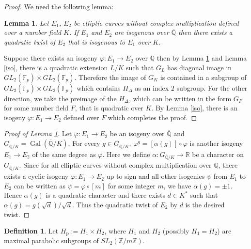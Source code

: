 \documentclass[12pt]{amsart}
\newtheorem{lem}[thm]{Lemma}
\theoremstyle{definition}
\newtheorem{defn}[thm]{Definition}
\theoremstyle{remark}
\numberwithin{equation}{section}
\newcommand{\F}{\mathbb{F}}
\newcommand{\Z}{\mathbb{Z}}
\newcommand{\Q}{\mathbb{Q}}
\DeclareMathOperator{\Gal}{Gal}
\begin{document}
\begin{proof}
We need the following lemma:
	 \begin{lem}\label{twist}
Let $E_{1}$, $E_{2}$ be elliptic curves without complex multiplication defined over a number field $K$. If $E_{1}$ and $E_{2}$ are isogenous over $\overline{\Q}$ then there exists a quadratic twist of $E_{2}$ that is isogenous to $E_{1}$ over $K$.	
\end{lem}
Suppose there exists an isogeny $\varphi: E_{1} \to E_{2}$ over $\overline{\Q}$ then by Lemma \ref{twist} and Lemma \ref{iso}, there is a quadratic extension $L/K$ such that $G_{L}$ has diagonal image in $GL_{2}(\F_{p}) \times GL_{2}(\F_{p})$. Therefore the image of $G_{K}$ is contained in a subgroup of $GL_{2}(\F_{p}) \times GL_{2}(\F_{p})$ which contains $H_{\Delta}$ as an index $2$ subgroup.
For the other direction, we take the preimage of the $H_{\Delta}$, which can be written in the form $G_{F}$ for some number field $F$, that is quadratic over $K$. By Lemma \ref{iso}, there is an isogeny $\varphi: E_{1} \to E_{2}$ defined over $F$ which completes the proof. 

\end{proof}



  \begin{proof}[Proof of Lemma \ref{twist}]
  Let $\varphi: E_{1} \to E_{2}$ be an isogeny over $\overline{\Q}$ and $G_{\overline{\Q}/K}=\Gal(\overline{\Q}/K)$. For every $g\in G_{\overline{\Q}/K}$, $\varphi^{g}=[\alpha(g)] \circ \varphi $ is another isogeny $E_{1} \to E_{2}$ of the same degree as $\varphi$. Here we define $\alpha: G_{\overline{\Q}/K} \to \mathbb{R}$ be a character on $G_{\overline{\Q}/K}$. Since for all elliptic curves without complex multiplication over $\overline{\Q}$, there exists a cyclic isogeny $\varphi: E_{1} \to E_{2}$ up to sign and all other isogenies $\psi$ from $E_{1}$ to $E_{2}$ can be written as $\psi=\varphi \circ [m]$ for some integer $m$, we have $\alpha(g)= \pm 1$. Hence $\alpha(g)$ is a quadratic character and there exists $d \in K^{*}$ such that $\alpha(g)=g(\sqrt{d})/\sqrt{d}$. Thus the quadratic twist of $E_{2}$ by $d$ is the desired twist. 
 
  \end{proof}


\vspace{1em}


\begin{defn}\label{Hprod}
  Let $H_{\text{p}}:=H_{1} \times H_{2}$, where $H_{1}$ and $H_{2}$ (possibly $H_{1}=H_{2}$) are maximal parabolic subgroups of $SL_{2}(\Z/m\Z)$.
\end{defn}
\end{document}
